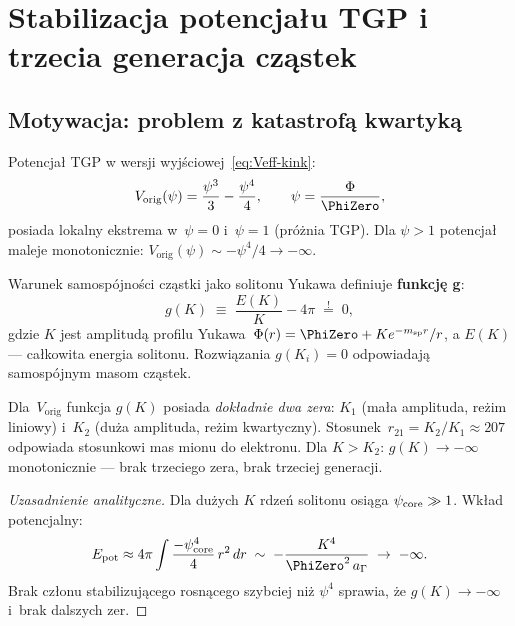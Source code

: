 \section{Stabilizacja potencjału TGP i trzecia generacja cząstek}%
\label{app:v2-potencjal}

\subsection{Motywacja: problem z katastrofą kwartyką}%
\label{app:I-motywacja}

Potencjał TGP w wersji wyjściowej~\eqref{eq:Veff-kink}:
\begin{equation}\label{eq:V-orig}
    V_{\mathrm{orig}}(\psi)
    = \frac{\psi^3}{3} - \frac{\psi^4}{4},
    \qquad \psi = \frac{\Phi}{\PhiZero},
\end{equation}
posiada lokalny ekstrema w~$\psi = 0$ i~$\psi = 1$ (próżnia TGP).
Dla $\psi > 1$ potencjał maleje monotonicznie:
$V_{\mathrm{orig}}(\psi) \sim -\psi^4/4 \to -\infty$.

Warunek samospójności cząstki jako solitonu Yukawa definiuje
\textbf{funkcję g}:
\begin{equation}\label{eq:g-def}
    g(K) \;\equiv\; \frac{E(K)}{K} - 4\pi \;\stackrel{!}{=}\; 0,
\end{equation}
gdzie $K$ jest amplitudą profilu Yukawa~$\Phi(r) = \PhiZero + K e^{-m_{\rm sp}r}/r$,
a $E(K)$ — całkowita energia solitonu. Rozwiązania $g(K_i) = 0$
odpowiadają samospójnym masom cząstek.

\begin{proposition}%
\label{prop:dwa-zera}
Dla~$V_{\mathrm{orig}}$ funkcja $g(K)$ posiada \emph{dokładnie dwa zera}:
$K_1$ (mała amplituda, reżim liniowy) i~$K_2$ (duża amplituda, reżim
kwartyczny). Stosunek~$r_{21} = K_2/K_1 \approx 207$
odpowiada stosunkowi mas mionu do elektronu.
Dla $K > K_2$: $g(K) \to -\infty$ monotonicznie —
brak trzeciego zera, brak trzeciej generacji.
\end{proposition}

\begin{proof}[Uzasadnienie analityczne]
Dla dużych $K$ rdzeń solitonu osiąga $\psi_{\rm core} \gg 1$.
Wkład potencjalny:
\[
    E_{\rm pot} \approx 4\pi \int \frac{-\psi_{\rm core}^4}{4}\, r^2\, dr
    \;\sim\; -\frac{K^4}{\PhiZero^2\, a_\Gamma} \;\to\; -\infty.
\]
Brak członu stabilizującego rosnącego szybciej niż $\psi^4$
sprawia, że $g(K) \to -\infty$ i~brak dalszych zer.
\end{proof}

